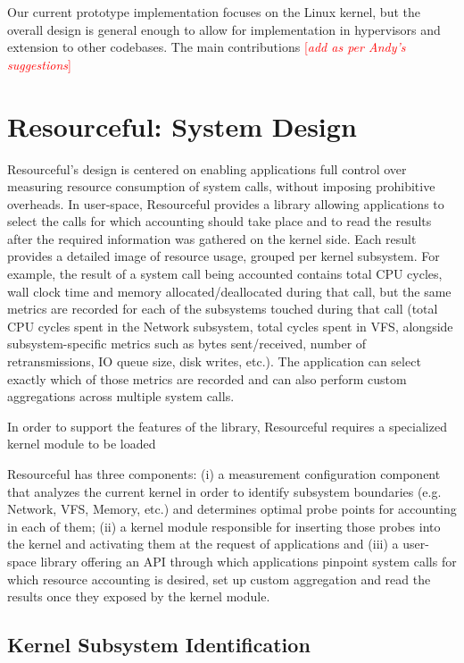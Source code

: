 \documentclass[letterpaper,twocolumn,10pt]{article}
\newcommand{\pname}{Resourceful}
\newcommand{\lnote}[1]{\textcolor{red}{[\textit{#1}]}} %
\begin{document}
Our current prototype implementation focuses on the Linux kernel, but the overall design is general enough to allow for implementation in hypervisors and extension to other codebases. The main contributions \lnote{add as per Andy's suggestions}

\section{\pname: System Design}
\pname's design is centered on enabling applications full control over measuring resource consumption of system calls, without imposing prohibitive overheads. In user-space, \pname{ } provides a library allowing applications to select the calls for which accounting should take place and to read the results after the required information was gathered on the kernel side. Each result provides a detailed image of resource usage, grouped per kernel subsystem. For example, the result of a system call being accounted contains total CPU cycles, wall clock time and memory allocated/deallocated during that call, but the same metrics are recorded for each of the subsystems touched during that call (total CPU cycles spent in the Network subsystem, total cycles spent in VFS, alongside subsystem-specific metrics such as bytes sent/received, number of retransmissions, IO queue size, disk writes, etc.). The application can select exactly which of those metrics are recorded and can also perform custom aggregations across multiple system calls.

In order to support the features of the library, \pname{ } requires a specialized kernel module to be loaded

\pname{ } has three components: (i) a measurement configuration component that analyzes the current kernel in order to identify subsystem boundaries (e.g. Network, VFS, Memory, etc.) and determines optimal probe points for accounting in each of them; (ii) a kernel module responsible for inserting those probes into the kernel and activating them at the request of applications and (iii) a user-space library offering an API through which applications pinpoint system calls for which resource accounting is desired, set up custom aggregation and read the results once they exposed by the kernel module. 
\subsection{Kernel Subsystem Identification}
\end{document}
